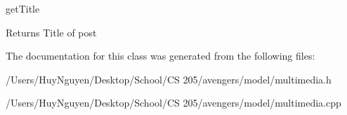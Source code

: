 get\+Title 

\begin{DoxyReturn}{Returns}
Title of post 
\end{DoxyReturn}


The documentation for this class was generated from the following files\+:\begin{DoxyCompactItemize}
\item 
/\+Users/\+Huy\+Nguyen/\+Desktop/\+School/\+C\+S 205/avengers/model/multimedia.\+h\item 
/\+Users/\+Huy\+Nguyen/\+Desktop/\+School/\+C\+S 205/avengers/model/multimedia.\+cpp\end{DoxyCompactItemize}
